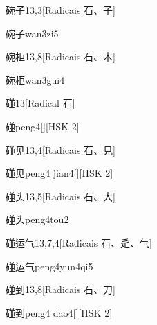 \begin{entry}{碗子}{13,3}[Radicais ⽯、⼦]
  \begin{phonetics}{碗子}{wan3zi5}
  \end{phonetics}
\end{entry}

\begin{entry}{碗柜}{13,8}[Radicais ⽯、⽊]
  \begin{phonetics}{碗柜}{wan3gui4}
  \end{phonetics}
\end{entry}

\begin{entry}{碰}{13}[Radical ⽯]
  \begin{phonetics}{碰}{peng4}[][HSK 2]
  \end{phonetics}
\end{entry}

\begin{entry}{碰见}{13,4}[Radicais ⽯、⾒]
  \begin{phonetics}{碰见}{peng4 jian4}[][HSK 2]
  \end{phonetics}
\end{entry}

\begin{entry}{碰头}{13,5}[Radicais ⽯、⼤]
  \begin{phonetics}{碰头}{peng4tou2}
  \end{phonetics}
\end{entry}

\begin{entry}{碰运气}{13,7,4}[Radicais ⽯、⾡、⽓]
  \begin{phonetics}{碰运气}{peng4yun4qi5}
  \end{phonetics}
\end{entry}

\begin{entry}{碰到}{13,8}[Radicais ⽯、⼑]
  \begin{phonetics}{碰到}{peng4 dao4}[][HSK 2]
  \end{phonetics}
\end{entry}

